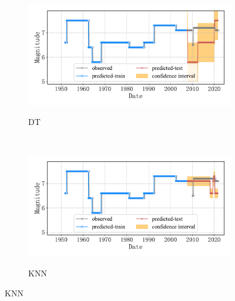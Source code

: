 \begin{figure}[!htbp]
\begin{subfigure}[b]{0.45\textwidth}
    \vspace{-1cm}
    \label{fig:seism_gbr_minyear_1932_maxyear_2021_spanlat_2_spanlon_4_timewindow_120_nextmonth_120_minmag_3.0_blocks1}
  \end{subfigure}
  ~
  \begin{subfigure}[b]{0.45\textwidth}
    \caption{DT}
    \vspace{-0.2cm}
    \includegraphics[width=\textwidth]{Img/chap5_seism/future10/seism_dt_minyear_1932_maxyear_2021_spanlat_2_spanlon_4_timewindow_120_nextmonth_120_minmag_3.0_blocks1.pdf}
    \vspace{-1cm}
    \label{fig:seism_dt_minyear_1932_maxyear_2021_spanlat_2_spanlon_4_timewindow_120_nextmonth_120_minmag_3.0_blocks1}
  \end{subfigure}
  \\
  \begin{subfigure}[b]{0.45\textwidth}
    \caption{KNN}
    \vspace{-0.2cm}
    \includegraphics[width=\textwidth]{Img/chap5_seism/future10/seism_kn_minyear_1932_maxyear_2021_spanlat_2_spanlon_4_timewindow_120_nextmonth_120_minmag_3.0_blocks1.pdf}
    \vspace{-1cm}
    \label{fig:seism_knn_minyear_1932_maxyear_2021_spanlat_2_spanlon_4_timewindow_120_nextmonth_120_minmag_3.0_blocks1}

\end{subfigure}
\end{figure}
